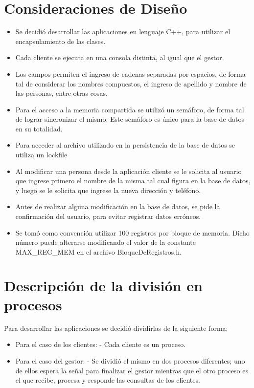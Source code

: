 \documentclass[11pt]{article}
\begin{document}
\section{Consideraciones de Dise\~no}

\begin{itemize}
\item Se decidió desarrollar las aplicaciones en lenguaje C++, para utilizar el encapsulamiento de las clases.
\item Cada cliente se ejecuta en una consola distinta, al igual que el gestor.
\item Los campos permiten el ingreso de cadenas separadas por espacios, de forma tal de considerar los nombres compuestos, el ingreso de apellido y 
nombre de las personas, entre otras cosas.
\item Para el acceso a la memoria compartida se utiliz\'o un sem\'aforo, de forma tal de lograr sincronizar el mismo. Este sem\'aforo es \'unico 
para la base de datos en su totalidad.
\item Para acceder al archivo utilizado en la persistencia de la base de datos se utiliza un lockfile 
\item Al modificar una persona desde la aplicaci\'on cliente se le solicita al usuario que ingrese primero el nombre de la misma tal cual figura en la base de datos, 
y luego se le solicita que ingrese la nueva direcci\'on y tel\'efono. 
\item Antes de realizar alguna modificación en la base de datos, se pide la confirmación del usuario, para evitar registrar datos erróneos.
\item Se tom\'o como convenci\'on utilizar 100 registros por bloque de memoria. Dicho n\'umero puede alterarse modificando el valor de la constante 
MAX\_REG\_MEM en el archivo BloqueDeRegistros.h.
\end{itemize}

\section{Descripci\'on de la divisi\'on en procesos}

Para desarrollar las aplicaciones se decidi\'o dividirlas de la siguiente forma:
\begin{itemize}
 \item Para el caso de los clientes:
  \subitem - Cada cliente es un proceso.
  \item Para el caso del gestor:
  \subitem - Se dividi\'o el mismo en dos procesos diferentes; uno de ellos espera la se\~nal para finalizar el gestor mientras que el otro proceso es el 
que recibe, procesa y responde las consultas de los clientes.
\end{itemize}
\end{document}
